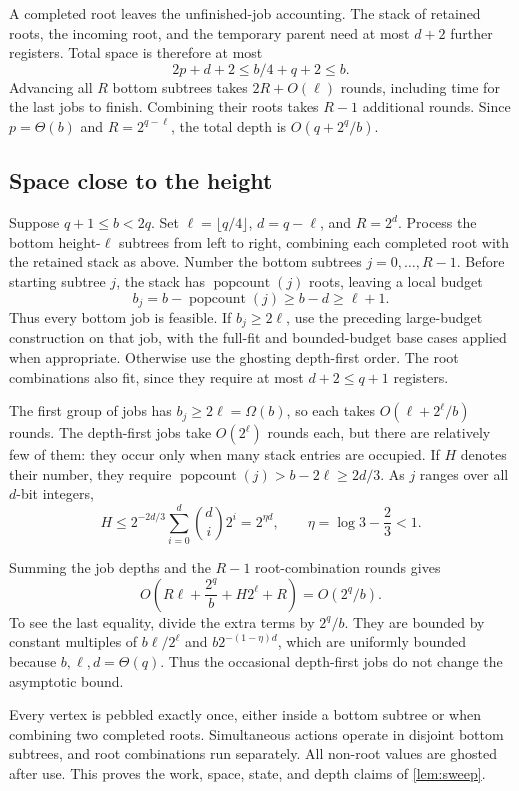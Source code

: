 \documentclass[11pt]{article}
\theoremstyle{definition}
\theoremstyle{remark}
\DeclareMathOperator{\popcount}{popcount}
\begin{document}
A completed root leaves the unfinished-job accounting. The stack of retained roots, the incoming root, and the temporary parent need at most $d+2$ further registers. Total space is therefore at most
\[
2p+d+2\le b/4+q+2\le b.
\]
Advancing all $R$ bottom subtrees takes $2R+O(\ell)$ rounds, including time for the last jobs to finish. Combining their roots takes $R-1$ additional rounds. Since $p=\Theta(b)$ and $R=2^{q-\ell}$, the total depth is $O(q+2^q/b)$.

\subsection{Space close to the height}

Suppose $q+1\le b<2q$. Set $\ell=\lfloor q/4\rfloor$, $d=q-\ell$, and $R=2^d$. Process the bottom height-$\ell$ subtrees from left to right, combining each completed root with the retained stack as above. Number the bottom subtrees $j=0,\ldots,R-1$. Before starting subtree $j$, the stack has $\popcount(j)$ roots, leaving a local budget
\[
b_j=b-\popcount(j)\ge b-d\ge\ell+1.
\]
Thus every bottom job is feasible. If $b_j\ge2\ell$, use the preceding large-budget construction on that job, with the full-fit and bounded-budget base cases applied when appropriate. Otherwise use the ghosting depth-first order. The root combinations also fit, since they require at most $d+2\le q+1$ registers.

The first group of jobs has $b_j\ge2\ell=\Omega(b)$, so each takes $O(\ell+2^\ell/b)$ rounds. The depth-first jobs take $O(2^\ell)$ rounds each, but there are relatively few of them: they occur only when many stack entries are occupied. If $H$ denotes their number, they require
$\popcount(j)>b-2\ell\ge2d/3$. As $j$ ranges over all $d$-bit integers,
\[
H\le2^{-2d/3}\sum_{i=0}^d\binom di2^i=2^{\eta d}, \qquad \eta=\log3-\frac23<1.
\]

Summing the job depths and the $R-1$ root-combination rounds gives
\[
O\!\left(R\ell+\frac{2^q}{b}+H2^\ell+R\right)=O(2^q/b).
\]
To see the last equality, divide the extra terms by $2^q/b$. They are bounded by constant multiples of $b\ell/2^\ell$ and $b2^{-(1-\eta)d}$, which are uniformly bounded because $b,\ell,d=\Theta(q)$. Thus the occasional depth-first jobs do not change the asymptotic bound.

Every vertex is pebbled exactly once, either inside a bottom subtree or when combining two completed roots. Simultaneous actions operate in disjoint bottom subtrees, and root combinations run separately. All non-root values are ghosted after use. This proves the work, space, state, and depth claims of \cref{lem:sweep}.
\end{document}
